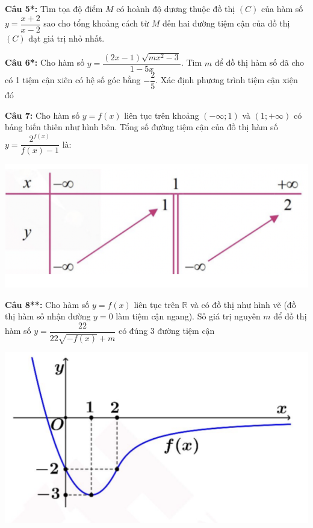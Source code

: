 \documentclass[12pt, a4paper]{article}
\begin{document}
		\textbf{Câu 5*: } Tìm tọa độ điểm $M$ có hoành độ dương thuộc đồ thị $(C)$ của hàm số $y=\dfrac{ x+2 }{ x-2 }$ sao cho tổng khoảng cách từ $M$ đến hai đường tiệm cận của đồ thị $(C)$ đạt giá trị nhỏ nhất.
		
		\textbf{Câu 6*: } Cho hàm số $y=\dfrac{( 2x-1 )\sqrt{mx^2-3}}{1-5x}$. Tìm $m$ để đồ thị hàm số đã cho có 1 tiệm cận xiên có hệ số góc bằng $- \dfrac{2}{5}$. Xác định phương trình tiệm cận xiện đó
		
		\textbf{Câu 7: } Cho hàm số $y=f(x)$ liên tục trên khoảng $(-\infty;1)$ và $(1;+\infty)$ có bảng biến thiên như hình bên. Tổng số đường tiệm cận của đồ thị hàm số $y=\dfrac{2^{f(x)}}{f(x)-1}$ là:
		
\vspace{-0.6cm}		
		
			\begin{center}
				\includegraphics[scale=0.6]{../images/tiemcan_cau7.png}
			\end{center}
			
\vspace{-0.6cm}			
			
		\textbf{Câu 8**: } Cho hàm số $y=f(x)$ liên tục trên $\mathbb{R}$ và có đồ thị như hình vẽ (đồ thị hàm số nhận đường $y=0$ làm tiệm cận ngang). Số giá trị nguyên $m$ để đồ thị hàm số $y=\dfrac{22}{22\sqrt{-f(x)}+m}$ có đúng 3 đường tiệm cận
		
\vspace{-0.6cm}	
		
			\begin{center}
				\includegraphics[scale=0.45]{../images/tiemcan_cau8.png}
			\end{center}
		
\end{document}
